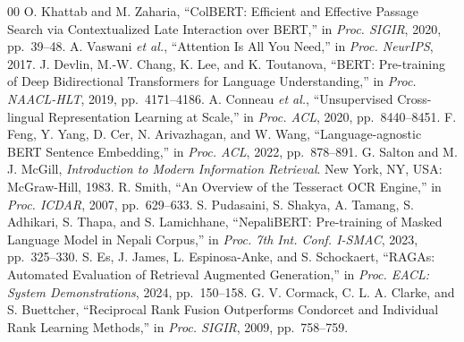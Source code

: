 \documentclass[journal]{IEEEtran}
\begin{document}
\begin{thebibliography}{00}
 O. Khattab and M. Zaharia, ``ColBERT: Efficient and Effective Passage Search via Contextualized Late Interaction over BERT,'' in \textit{Proc. SIGIR}, 2020, pp.\ 39--48.
 A. Vaswani \textit{et al.}, ``Attention Is All You Need,'' in \textit{Proc. NeurIPS}, 2017.
 J. Devlin, M.-W. Chang, K. Lee, and K. Toutanova, ``BERT: Pre-training of Deep Bidirectional Transformers for Language Understanding,'' in \textit{Proc. NAACL-HLT}, 2019, pp.\ 4171--4186.
 A. Conneau \textit{et al.}, ``Unsupervised Cross-lingual Representation Learning at Scale,'' in \textit{Proc. ACL}, 2020, pp.\ 8440--8451.
 F. Feng, Y. Yang, D. Cer, N. Arivazhagan, and W. Wang, ``Language-agnostic BERT Sentence Embedding,'' in \textit{Proc. ACL}, 2022, pp.\ 878--891.
 G. Salton and M. J. McGill, \textit{Introduction to Modern Information Retrieval}. New York, NY, USA: McGraw-Hill, 1983.
 R. Smith, ``An Overview of the Tesseract OCR Engine,'' in \textit{Proc. ICDAR}, 2007, pp.\ 629--633.
 S. Pudasaini, S. Shakya, A. Tamang, S. Adhikari, S. Thapa, and S. Lamichhane, ``NepaliBERT: Pre-training of Masked Language Model in Nepali Corpus,'' in \textit{Proc. 7th Int. Conf. I-SMAC}, 2023, pp.\ 325--330.
 S. Es, J. James, L. Espinosa-Anke, and S. Schockaert, ``RAGAs: Automated Evaluation of Retrieval Augmented Generation,'' in \textit{Proc. EACL: System Demonstrations}, 2024, pp.\ 150--158.
 G. V. Cormack, C. L. A. Clarke, and S. Buettcher, ``Reciprocal Rank Fusion Outperforms Condorcet and Individual Rank Learning Methods,'' in \textit{Proc. SIGIR}, 2009, pp.\ 758--759.
\end{thebibliography}
\end{document}
